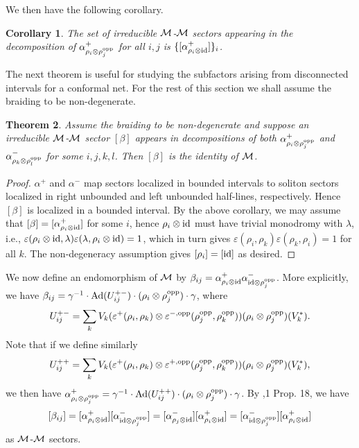 \documentclass[12pt]{article}
\def\Ad{{\hbox{\rm Ad}}}
\def\id{{\rm id}}
\def\o{{\rm opp}}
\def\a{\alpha}
\def\be{\beta}
\def\e{\varepsilon}
\def\ga{\gamma}
\newtheorem{theorem}{Theorem}
\newtheorem{corollary}[theorem]{Corollary}
\def\M{{\cal M}}
\begin{document}
We then have the following corollary.

\begin{corollary}
\label{CC14}
The set of irreducible $\M$-$\M$ sectors appearing in the
decomposition of $\a^+_{\rho_i\otimes\rho_j^\o}$ for all $i,j$
is $\{[\a^+_{\rho_i\otimes\id}]\}_i$.
\end{corollary}

The next theorem is useful for studying the
subfactors arising from disconnected intervals for a conformal
net. For the rest of this section we shall assume the
braiding to be non-degenerate.

\begin{theorem}
\label{intersect}
Assume the braiding to be non-degenerate and
suppose an irreducible $\M$-$\M$ sector $[\be]$ appears in
decompositions
of both $\a^+_{\rho_i\otimes\rho_j^\o}$
and $\a^-_{\rho_k\otimes\rho_l^\o}$  for some $i,j, k, l$.
Then $[\be]$ is the identity of $\M$.
\end{theorem}

\begin{proof}
$\a^+$ and $\a^-$ map sectors localized in
bounded intervals to soliton sectors localized in right unbounded
and left unbounded half-lines, respectively. Hence $[\be]$ is
localized
in a bounded interval.
By the above corollary, we may assume that
$[\be]=[\a^+_{\rho_i\otimes\id}]$
for some $i$, hence $\rho_i\otimes\id$ must have trivial monodromy
with $\lambda$, i.e.,
$\e(\rho_i\otimes\id,\lambda)\e(\lambda,\rho_i\otimes\id)=1$,
which in turn gives  $\e(\rho_i,\rho_k)\e(\rho_k,\rho_i)=1$
for all $k$.  The non-degeneracy assumption gives
$[\rho_i]=[\id]$ as desired.
\end{proof}

We now define an endomorphism of $\M$ by
$\be_{ij}=\a^+_{\rho_i\otimes\id}\a^-_{\id\otimes\rho_j^\o}$.
More explicitly, we have
$\be_{ij}=\ga^{-1}\cdot\Ad(U_{ij}^{+-})\cdot(\rho_i\otimes
\rho_j^\o)\cdot\ga$, where
$$U_{ij}^{+-}=\sum_k V_k(\e^+(\rho_i,\rho_k)\otimes
\e^{-,\o}(\rho_j^\o,\rho_k^\o))(\rho_i\otimes\rho_j^\o)(V_k^*).$$
Note that if we define similarly
$$U_{ij}^{++}=\sum_k V_k(\e^+(\rho_i,\rho_k)\otimes
\e^{+,\o}(\rho_j^\o,\rho_k^\o))(\rho_i\otimes\rho_j^\o)(V_k^*),$$
we then have $\a^+_{\rho_i\otimes\rho_j^\o}=
\ga^{-1}\cdot\Ad(U_{ij}^{++})\cdot(\rho_i\otimes
\rho_j^\o)\cdot\ga$.  By \cite{BE},1 Prop. 18, we have
$$[\be_{ij}]=
[\a^+_{\rho_i\otimes\id}]
[\a^-_{\id\otimes\rho_j^\o}]
= [\a^-_{\rho_j\otimes\id}]
[\a^+_{\rho_i\otimes\id}]
= [\a^-_{\id\otimes\rho_j^\o}]
[\a^+_{\rho_i\otimes\id}]$$
as $\M$-$\M$ sectors.
\end{document}
